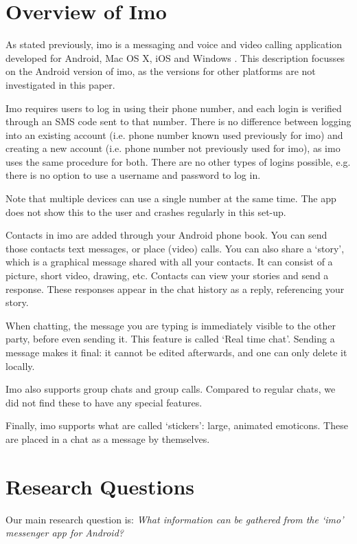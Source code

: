 \documentclass[conference]{IEEEtran}
\begin{document}
\section{Overview of Imo}

As stated previously, imo is a messaging and voice and video calling application
developed for Android, Mac OS X, iOS and Windows \cite{imo}. This description
focusses on the Android version of imo, as the versions for other platforms are
not investigated in this paper.

Imo requires users to log in using their phone number, and each login is
verified through an SMS code sent to that number. There is no difference between
logging into an existing account (i.e. phone number known used previously for
imo) and creating a new account (i.e. phone number not previously used for imo),
as imo uses the same procedure for both. There are no other types of logins
possible, e.g. there is no option to use a username and password to log in.

Note that multiple devices can use a single number at the same time. The app
does not show this to the user and crashes regularly in this set-up.

Contacts in imo are added through your Android phone book. You can send those
contacts text messages, or place (video) calls. You can also share a `story',
which is a graphical message shared with all your contacts. It can consist of a
picture, short video, drawing, etc. Contacts can view your stories and send a
response. These responses appear in the chat history as a reply, referencing
your story.

When chatting, the message you are typing is immediately visible to the other
party, before even sending it. This feature is called `Real time chat'. Sending
a message makes it final: it cannot be edited afterwards, and one can only
delete it locally.

Imo also supports group chats and group calls. Compared to regular chats, we
did not find these to have any special features.

Finally, imo supports what are called `stickers': large, animated emoticons.
These are placed in a chat as a message by themselves.


\section{Research Questions}\label{sec:researchq}

Our main research question is:
{\it What information can be gathered from the `imo' messenger app for Android?}
\end{document}
